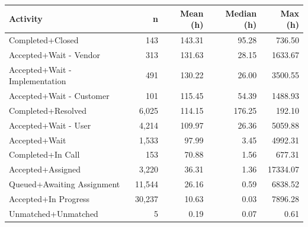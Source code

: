 \begin{tabular}{lrrrr}
\toprule
Activity & n & Mean (h) & Median (h) & Max (h) \\
\midrule
Completed+Closed & 143 & 143.31 & 95.28 & 736.50 \\
Accepted+Wait - Vendor & 313 & 131.63 & 28.15 & 1633.67 \\
Accepted+Wait - Implementation & 491 & 130.22 & 26.00 & 3500.55 \\
Accepted+Wait - Customer & 101 & 115.45 & 54.39 & 1488.93 \\
Completed+Resolved & 6,025 & 114.15 & 176.25 & 192.10 \\
Accepted+Wait - User & 4,214 & 109.97 & 26.36 & 5059.88 \\
Accepted+Wait & 1,533 & 97.99 & 3.45 & 4992.31 \\
Completed+In Call & 153 & 70.88 & 1.56 & 677.31 \\
Accepted+Assigned & 3,220 & 36.31 & 1.36 & 17334.07 \\
Queued+Awaiting Assignment & 11,544 & 26.16 & 0.59 & 6838.52 \\
Accepted+In Progress & 30,237 & 10.63 & 0.03 & 7896.28 \\
Unmatched+Unmatched & 5 & 0.19 & 0.07 & 0.61 \\
\bottomrule
\end{tabular}
